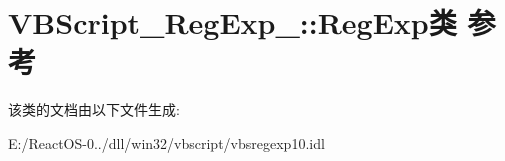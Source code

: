 \hypertarget{class_v_b_script___reg_exp__10_1_1_reg_exp}{}\section{V\+B\+Script\+\_\+\+Reg\+Exp\+\_\+:\+:Reg\+Exp类 参考}
\label{class_v_b_script___reg_exp__10_1_1_reg_exp}


该类的文档由以下文件生成\+:\begin{DoxyCompactItemize}
\item 
E\+:/\+React\+O\+S-\/0../dll/win32/vbscript/vbsregexp10.\+idl\end{DoxyCompactItemize}

